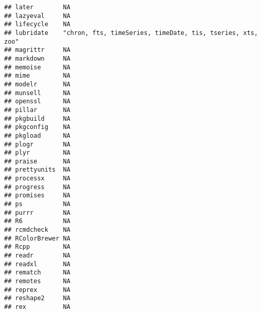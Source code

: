 \documentclass[]{book}
\begin{document}
\begin{verbatim}
## later        NA                                                        
## lazyeval     NA                                                        
## lifecycle    NA                                                        
## lubridate    "chron, fts, timeSeries, timeDate, tis, tseries, xts, zoo"
## magrittr     NA                                                        
## markdown     NA                                                        
## memoise      NA                                                        
## mime         NA                                                        
## modelr       NA                                                        
## munsell      NA                                                        
## openssl      NA                                                        
## pillar       NA                                                        
## pkgbuild     NA                                                        
## pkgconfig    NA                                                        
## pkgload      NA                                                        
## plogr        NA                                                        
## plyr         NA                                                        
## praise       NA                                                        
## prettyunits  NA                                                        
## processx     NA                                                        
## progress     NA                                                        
## promises     NA                                                        
## ps           NA                                                        
## purrr        NA                                                        
## R6           NA                                                        
## rcmdcheck    NA                                                        
## RColorBrewer NA                                                        
## Rcpp         NA                                                        
## readr        NA                                                        
## readxl       NA                                                        
## rematch      NA                                                        
## remotes      NA                                                        
## reprex       NA                                                        
## reshape2     NA                                                        
## rex          NA                                                        

\end{verbatim}
\end{document}
